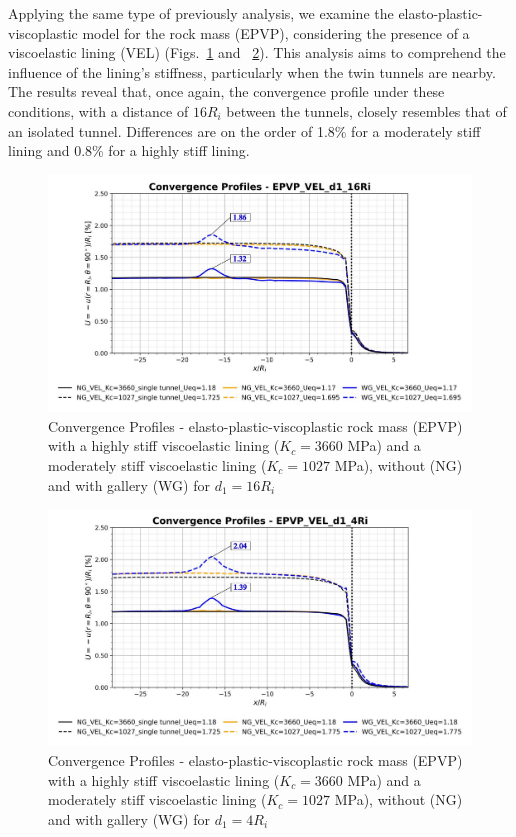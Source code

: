 \documentclass[a4paper,fleqn]{cas-sc}
\begin{document}
Applying the same type of previously analysis, we examine the elasto-plastic-viscoplastic model for the rock mass (EPVP), considering the presence of a viscoelastic lining (VEL) (Figs.~\ref{EPVP_VEL_d1_16Ri} and ~\ref{EPVP_VEL_d1_4Ri}). This analysis aims to comprehend the influence of the lining's stiffness, particularly when the twin tunnels are nearby. The results reveal that, once again, the convergence profile under these conditions, with a distance of $16R_i$ between the tunnels, closely resembles that of an isolated tunnel. Differences are on the order of 1.8\% for a moderately stiff lining and 0.8\% for a highly stiff lining.
\begin{figure}[h!]
	\centering
	\includegraphics[scale=0.5]{Convergence Profiles - EPVP_VEL_d1_16Ri.pdf}
	\caption{Convergence Profiles - elasto-plastic-viscoplastic rock mass (EPVP) with a highly stiff viscoelastic lining ($K_c = 3660$ MPa) and a moderately stiff viscoelastic lining ($K_c = 1027$ MPa), without (NG) and with gallery (WG) for $d_1 = 16R_i$}
	\label{EPVP_VEL_d1_16Ri}
\end{figure}
\FloatBarrier
\begin{figure}[h!]
	\centering
	\includegraphics[scale=0.5]{Convergence Profiles - EPVP_VEL_d1_4Ri.pdf}
	\caption{Convergence Profiles - elasto-plastic-viscoplastic rock mass (EPVP) with a highly stiff viscoelastic lining ($K_c = 3660$ MPa) and a moderately stiff viscoelastic lining ($K_c = 1027$ MPa), without (NG) and with gallery (WG) for $d_1 = 4R_i$}
	\label{EPVP_VEL_d1_4Ri}
\end{figure}
\end{document}

